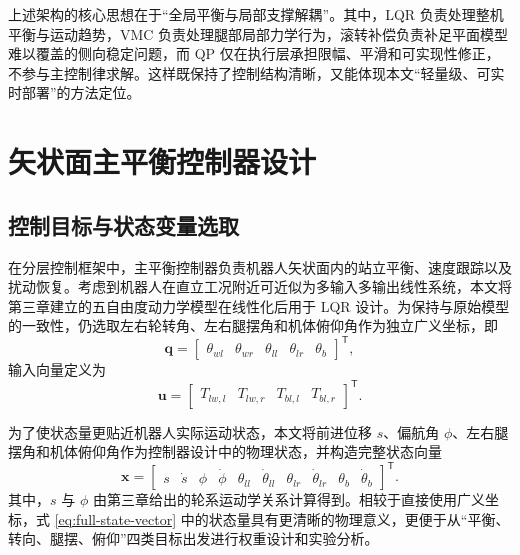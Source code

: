 上述架构的核心思想在于“全局平衡与局部支撑解耦”。其中，LQR 负责处理整机平衡与运动趋势，VMC 负责处理腿部局部力学行为，滚转补偿负责补足平面模型难以覆盖的侧向稳定问题，而 QP 仅在执行层承担限幅、平滑和可实现性修正，不参与主控制律求解。这样既保持了控制结构清晰，又能体现本文“轻量级、可实时部署”的方法定位。

\section{矢状面主平衡控制器设计}

\subsection{控制目标与状态变量选取}

在分层控制框架中，主平衡控制器负责机器人矢状面内的站立平衡、速度跟踪以及扰动恢复。考虑到机器人在直立工况附近可近似为多输入多输出线性系统，本文将第三章建立的五自由度动力学模型在线性化后用于 LQR 设计。为保持与原始模型的一致性，仍选取左右轮转角、左右腿摆角和机体俯仰角作为独立广义坐标，即
\begin{equation}
  \boldsymbol{q} =
  \begin{bmatrix}
    \theta_{wl} & \theta_{wr} & \theta_{ll} & \theta_{lr} & \theta_b
  \end{bmatrix}^{\mathsf{T}},
  \label{eq:full-generalized-coordinate}
\end{equation}
输入向量定义为
\begin{equation}
  \boldsymbol{u} =
  \begin{bmatrix}
    T_{lw,l} & T_{lw,r} & T_{bl,l} & T_{bl,r}
  \end{bmatrix}^{\mathsf{T}}.
  \label{eq:full-input-vector}
\end{equation}

为了使状态量更贴近机器人实际运动状态，本文将前进位移 $s$、偏航角 $\phi$、左右腿摆角和机体俯仰角作为控制器设计中的物理状态，并构造完整状态向量
\begin{equation}
  \boldsymbol{x}
  =
  \begin{bmatrix}
    s & \dot{s} & \phi & \dot{\phi} & \theta_{ll} & \dot{\theta}_{ll} &
    \theta_{lr} & \dot{\theta}_{lr} & \theta_b & \dot{\theta}_b
  \end{bmatrix}^{\mathsf{T}}.
  \label{eq:full-state-vector}
\end{equation}
其中，$s$ 与 $\phi$ 由第三章给出的轮系运动学关系计算得到。相较于直接使用广义坐标，式 \eqref{eq:full-state-vector} 中的状态量具有更清晰的物理意义，更便于从“平衡、转向、腿摆、俯仰”四类目标出发进行权重设计和实验分析。

